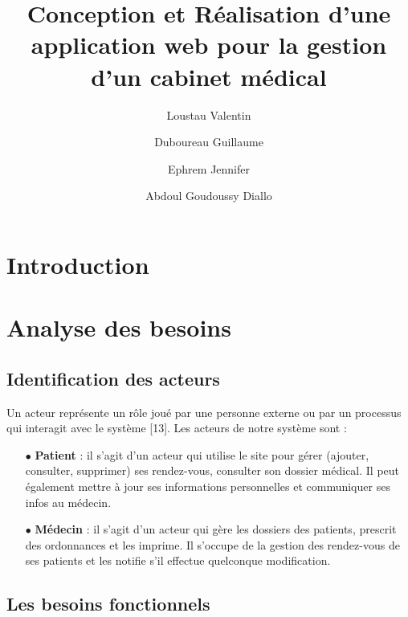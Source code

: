 \documentclass[a4paper]{book}
\begin{document}
\title{Conception et Réalisation d’une application web pour la gestion
d’un cabinet médical}
\author{Loustau Valentin \and Duboureau Guillaume \and Ephrem Jennifer \and Abdoul Goudoussy Diallo}
\date{}
\maketitle
\let\cleardoublepage\clearpage
\tableofcontents

\chapter{Introduction}

\chapter{Analyse des besoins}
\section{Identification des acteurs}

Un acteur représente un rôle joué par une personne externe ou par un processus qui
interagit avec le système [13].
\newline\newline
Les acteurs de notre système sont :
\newline
\begin{itemize}
    \item[$\bullet$] \textbf{Patient} : il s’agit d’un acteur qui utilise le site pour gérer 
    (ajouter, consulter, supprimer) ses rendez-vous, consulter son dossier médical. 
    Il peut également mettre à jour ses informations personnelles et communiquer ses infos au médecin.
    \item[$\bullet$] \textbf{Médecin} : il s’agit d’un acteur qui gère les dossiers des patients, prescrit des ordonnances et 
    les imprime. Il s’occupe de la gestion des rendez-vous de ses patients et les notifie s’il effectue 
    quelconque modification.
  \end{itemize}
  
\section{Les besoins fonctionnels}
\end{document}
